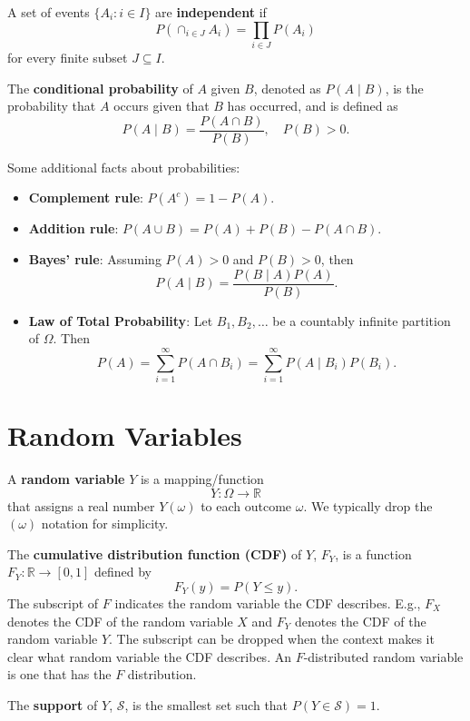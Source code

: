 \documentclass[
]{book}
\providecommand{\tightlist}{%
  \setlength{\itemsep}{0pt}\setlength{\parskip}{0pt}}
\theoremstyle{definition}
\theoremstyle{definition}
\theoremstyle{definition}
\theoremstyle{definition}
\theoremstyle{remark}
\begin{document}
A set of events \(\{A_i:i\in I\}\) are \textbf{independent} if
\[
P\left(\cap_{i\in J} A_i \right)=\prod_{i\in J} P(A_i )
\]
for every finite subset \(J\subseteq I\).

The \textbf{conditional probability} of \(A\) given \(B\), denoted as \(P(A\mid B)\), is the probability that \(A\) occurs given that \(B\) has occurred, and is defined as
\[
P(A\mid B) = \frac{P(A\cap B)}{P(B)}, \quad P(B) > 0.
\]

Some additional facts about probabilities:

\begin{itemize}
\tightlist
\item
  \textbf{Complement rule}: \(P(A^c) = 1 - P(A)\).
\item
  \textbf{Addition rule}: \(P(A\cup B) = P(A) + P(B) - P(A \cap B)\).
\item
  \textbf{Bayes' rule}: Assuming \(P(A) > 0\) and \(P(B) > 0\), then
  \[P(A\mid B) = \frac{P(B\mid A)P(A)}{P(B)}.\]
\item
  \textbf{Law of Total Probability}: Let \(B_1, B_2, \ldots\) be a countably infinite partition of \(\Omega\). Then
  \[P(A) = \sum_{i=1}^{\infty} P(A \cap B_i) = \sum_{i=1}^{\infty} P(A \mid B_i) P(B_i).\]
\end{itemize}

\hypertarget{random-variables}{%
\section{Random Variables}\label{random-variables}}

A \textbf{random variable} \(Y\) is a mapping/function
\[
Y:\Omega\to\mathbb{R}
\]
that assigns a real number \(Y(\omega)\) to each outcome \(\omega\). We typically drop the \((\omega)\) notation for simplicity.

The \textbf{cumulative distribution function (CDF)} of \(Y\), \(F_Y\), is a function \(F_Y:\mathbb{R}\to [0,1]\) defined by
\[
F_Y (y)=P(Y \leq y).
\]
The subscript of \(F\) indicates the random variable the CDF describes. E.g., \(F_X\) denotes the CDF of the random variable \(X\) and \(F_Y\) denotes the CDF of the random variable \(Y\). The subscript can be dropped when the context makes it clear what random variable the CDF describes. An \(F\)-distributed random variable is one that has the \(F\) distribution.

The \textbf{support} of \(Y\), \(\mathcal{S}\), is the smallest set such that \(P(Y\in \mathcal{S})=1\).
\end{document}

